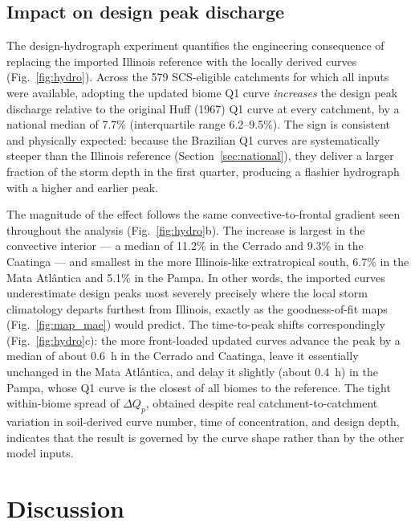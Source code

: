 \documentclass[a4paper,fleqn]{cas-sc}
\begin{document}
\subsection{Impact on design peak discharge}
\label{sec:hydro_results}

The design-hydrograph experiment quantifies the engineering consequence
of replacing the imported Illinois reference with the locally derived
curves (Fig.~\ref{fig:hydro}). Across the 579 SCS-eligible catchments
for which all inputs were available, adopting the updated biome Q1 curve
\emph{increases} the design peak discharge relative to the original Huff
(1967) Q1 curve at every catchment, by a national median of 7.7\%
(interquartile range 6.2–9.5\%). The sign is consistent and physically
expected: because the Brazilian Q1 curves are systematically steeper
than the Illinois reference (Section~\ref{sec:national}), they deliver a
larger fraction of the storm depth in the first quarter, producing a
flashier hydrograph with a higher and earlier peak.

The magnitude of the effect follows the same convective-to-frontal
gradient seen throughout the analysis (Fig.~\ref{fig:hydro}b). The
increase is largest in the convective interior — a median of 11.2\% in
the Cerrado and 9.3\% in the Caatinga — and smallest in the more
Illinois-like extratropical south, 6.7\% in the Mata Atlântica and 5.1\%
in the Pampa. In other words, the imported curves underestimate design
peaks most severely precisely where the local storm climatology departs
furthest from Illinois, exactly as the goodness-of-fit maps
(Fig.~\ref{fig:map_mae}) would predict. The time-to-peak shifts
correspondingly (Fig.~\ref{fig:hydro}c): the more front-loaded updated
curves advance the peak by a median of about 0.6~h in the Cerrado and
Caatinga, leave it essentially unchanged in the Mata Atlântica, and
delay it slightly (about 0.4~h) in the Pampa, whose Q1 curve is the
closest of all biomes to the reference. The tight within-biome spread of
$\Delta Q_p$, obtained despite real catchment-to-catchment variation in
soil-derived curve number, time of concentration, and design depth,
indicates that the result is governed by the curve shape rather than by
the other model inputs.

\section{Discussion}
\label{sec:discussion}
\end{document}
